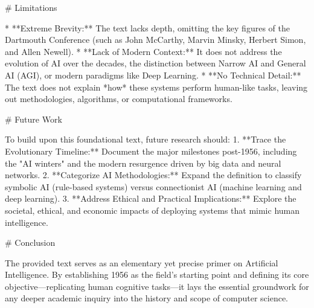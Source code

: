 \documentclass{article}
\begin{document}
# Limitations

* **Extreme Brevity:** The text lacks depth, omitting the key figures of the Dartmouth Conference (such as John McCarthy, Marvin Minsky, Herbert Simon, and Allen Newell).
* **Lack of Modern Context:** It does not address the evolution of AI over the decades, the distinction between Narrow AI and General AI (AGI), or modern paradigms like Deep Learning.
* **No Technical Detail:** The text does not explain *how* these systems perform human-like tasks, leaving out methodologies, algorithms, or computational frameworks.

# Future Work

To build upon this foundational text, future research should:
1. **Trace the Evolutionary Timeline:** Document the major milestones post-1956, including the "AI winters" and the modern resurgence driven by big data and neural networks.
2. **Categorize AI Methodologies:** Expand the definition to classify symbolic AI (rule-based systems) versus connectionist AI (machine learning and deep learning).
3. **Address Ethical and Practical Implications:** Explore the societal, ethical, and economic impacts of deploying systems that mimic human intelligence.

# Conclusion

The provided text serves as an elementary yet precise primer on Artificial Intelligence. By establishing 1956 as the field's starting point and defining its core objective—replicating human cognitive tasks—it lays the essential groundwork for any deeper academic inquiry into the history and scope of computer science.
\end{document}
